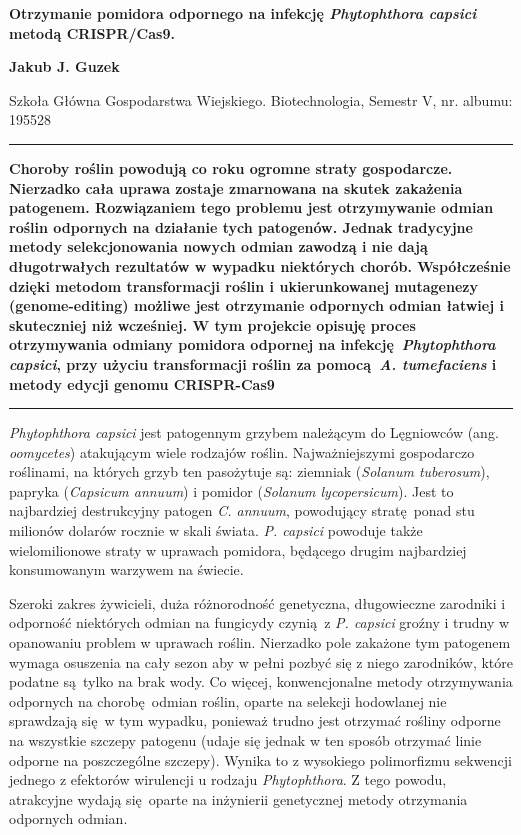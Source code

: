 \documentclass[two column, twoside, a4paper]{article}
\begin{document}
\begin{strip}
	{\sc \bfseries \LARGE {}\selectfont Otrzymanie pomidora odpornego na infekcję \textit{Phytophthora capsici} metodą CRISPR/Cas9.} \vspace{\baselineskip}

{\bfseries \large Jakub J. Guzek}

{Szkoła Główna Gospodarstwa Wiejskiego. Biotechnologia, Semestr V, nr. albumu: 195528}\vspace{\baselineskip}

\hrule\vspace{\baselineskip}

	\textbf{\textsf{Choroby roślin powodują co roku ogromne straty gospodarcze. Nierzadko cała uprawa zostaje zmarnowana na skutek zakażenia patogenem. Rozwiązaniem tego problemu jest otrzymywanie odmian roślin odpornych na działanie tych patogenów. Jednak tradycyjne metody selekcjonowania nowych odmian zawodzą i nie dają długotrwałych rezultatów w wypadku niektórych chorób. Współcześnie dzięki metodom transformacji roślin i ukierunkowanej mutagenezy (genome-editing) możliwe jest otrzymanie odpornych odmian łatwiej i skuteczniej niż wcześniej. W tym projekcie opisuję proces otrzymywania odmiany pomidora odpornej na infekcję \textit{Phytophthora capsici}, przy użyciu transformacji roślin za pomocą \textit{A. tumefaciens} i metody edycji genomu CRISPR-Cas9}}\vspace{\baselineskip}

\hrule

\end{strip}

\textit{Phytophthora capsici} jest patogennym grzybem należącym do Lęgniowców (ang. \textit{oomycetes}) atakującym wiele rodzajów roślin. Najważniejszymi gospodarczo roślinami, na których grzyb ten pasożytuje są: ziemniak (\textit{Solanum tuberosum}), papryka (\textit{Capsicum annuum}) i pomidor (\textit{Solanum lycopersicum})\autocite{Lamour2012}. Jest to najbardziej destrukcyjny patogen \textit{C. annuum}, powodujący stratę ponad stu milionów dolarów rocznie w skali świata\autocite{Barchenger2018}. \textit{P. capsici} powoduje także wielomilionowe straty w uprawach pomidora, będącego drugim najbardziej konsumowanym warzywem na świecie.

Szeroki zakres żywicieli, duża różnorodność genetyczna, długowieczne zarodniki i odporność niektórych odmian na fungicydy czynią z \textit{P. capsici} groźny i trudny w opanowaniu problem w uprawach roślin. Nierzadko pole zakażone tym patogenem wymaga osuszenia na cały sezon aby w pełni pozbyć się z niego zarodników, które podatne są tylko na brak wody\autocite{Lamour2012}. Co więcej, konwencjonalne metody otrzymywania odpornych na chorobę odmian roślin, oparte na selekcji hodowlanej nie sprawdzają się w tym wypadku, ponieważ trudno jest otrzymać rośliny odporne na wszystkie szczepy patogenu (udaje się jednak w ten sposób otrzymać linie odporne na poszczególne szczepy\autocite{Sy2005}). Wynika to z wysokiego polimorfizmu sekwencji jednego z efektorów wirulencji u rodzaju \textit{Phytophthora}\autocite{Chen2019}. Z tego powodu, atrakcyjne wydają się oparte na inżynierii genetycznej metody otrzymania odpornych odmian.
\end{document}
